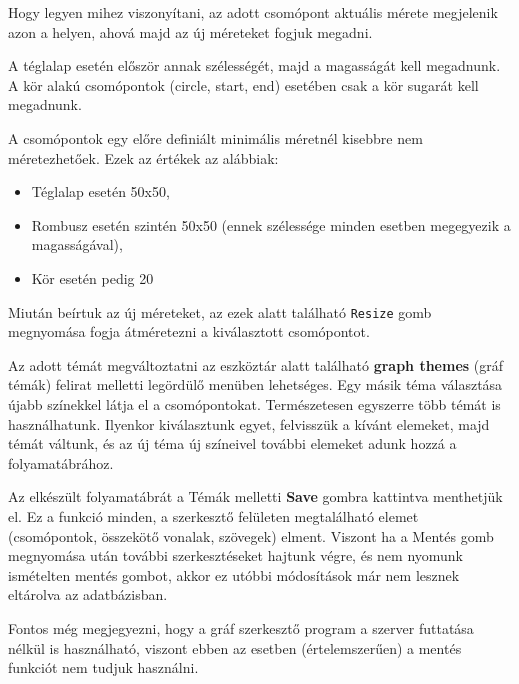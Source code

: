 Hogy legyen mihez viszonyítani, az adott csomópont aktuális mérete megjelenik azon a helyen, ahová majd az új méreteket fogjuk megadni.

A téglalap esetén először annak szélességét, majd a magasságát kell megadnunk. A kör alakú csomópontok (circle, start, end) esetében csak a kör sugarát kell megadnunk.

A csomópontok egy előre definiált minimális méretnél kisebbre nem méretezhetőek. Ezek az értékek az alábbiak:
\begin{itemize}
\item Téglalap esetén 50x50,
\item Rombusz esetén szintén 50x50 (ennek szélessége minden esetben megegyezik a magasságával), 
\item Kör esetén pedig 20
\end{itemize}
Miután beírtuk az új méreteket, az ezek alatt található \texttt{Resize} gomb megnyomása fogja átméretezni a kiválasztott csomópontot.


Az adott témát megváltoztatni az eszköztár alatt található \textbf{graph themes} (gráf témák) felirat melletti legördülő menüben lehetséges. Egy másik téma választása újabb színekkel látja el a csomópontokat. Természetesen egyszerre több témát is használhatunk. Ilyenkor kiválasztunk egyet, felvisszük a kívánt elemeket, majd témát váltunk, és az új téma új színeivel további elemeket adunk hozzá a folyamatábrához.


Az elkészült folyamatábrát a Témák melletti \textbf{Save} gombra kattintva menthetjük el. Ez a funkció minden, a szerkesztő felületen megtalálható elemet (csomópontok, összekötő vonalak, szövegek) elment. Viszont ha a Mentés gomb megnyomása után további szerkesztéseket hajtunk végre, és nem nyomunk ismételten mentés gombot, akkor ez utóbbi módosítások már nem lesznek eltárolva az adatbázisban.

Fontos még megjegyezni, hogy a gráf szerkesztő program a szerver futtatása nélkül is használható, viszont ebben az esetben (értelemszerűen) a mentés funkciót nem tudjuk használni.